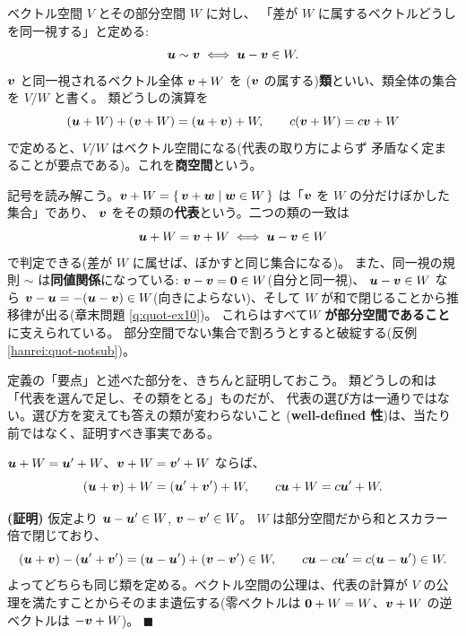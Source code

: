 \begin{teigi}[商空間]
ベクトル空間 $V$ とその部分空間 $W$ に対し、
「差が $W$ に属するベクトルどうしを同一視する」と定める:
\[
\bm{u} \sim \bm{v} \iff \bm{u} - \bm{v} \in W.
\]
$\bm{v}$ と同一視されるベクトル全体 $\bm{v} + W$ を
($\bm{v}$ の属する)\textbf{類}といい、類全体の集合を $V/W$ と書く。
類どうしの演算を
\[
(\bm{u} + W) + (\bm{v} + W) = (\bm{u} + \bm{v}) + W, \qquad
c(\bm{v} + W) = c\bm{v} + W
\]
で定めると、$V/W$ はベクトル空間になる(代表の取り方によらず
矛盾なく定まることが要点である)。これを\textbf{商空間}という。
\end{teigi}

記号を読み解こう。$\bm{v} + W = \{\, \bm{v} + \bm{w} \mid
\bm{w} \in W \,\}$ は「$\bm{v}$ を $W$ の分だけぼかした集合」であり、
$\bm{v}$ をその類の\textbf{代表}という。二つの類の一致は
\[
\bm{u} + W = \bm{v} + W \iff \bm{u} - \bm{v} \in W
\]
で判定できる(差が $W$ に属せば、ぼかすと同じ集合になる)。
また、同一視の規則 $\sim$ は\textbf{同値関係}になっている:
$\bm{v} - \bm{v} = \bm{0} \in W$(自分と同一視)、
$\bm{u} - \bm{v} \in W$ なら $\bm{v} - \bm{u} =
-(\bm{u} - \bm{v}) \in W$(向きによらない)、そして
$W$ が和で閉じることから推移律が出る(章末問題 \ref{q:quot-ex10})。
これらはすべて\textbf{$W$ が部分空間であること}に支えられている。
部分空間でない集合で割ろうとすると破綻する(反例 \ref{hanrei:quot-notsub})。

定義の「要点」と述べた部分を、きちんと証明しておこう。
類どうしの和は「代表を選んで足し、その類をとる」ものだが、
代表の選び方は一通りではない。選び方を変えても答えの類が変わらないこと
(\textbf{well-defined 性})は、当たり前ではなく、証明すべき事実である。

\begin{teiri}[類の演算は代表の取り方によらない]\label{thm:quot-welldef}
$\bm{u} + W = \bm{u}' + W$、$\bm{v} + W = \bm{v}' + W$ ならば、
\[
(\bm{u} + \bm{v}) + W = (\bm{u}' + \bm{v}') + W, \qquad
c\bm{u} + W = c\bm{u}' + W.
\]
\end{teiri}

\noindent\textbf{(証明)}\quad
仮定より $\bm{u} - \bm{u}' \in W$, $\bm{v} - \bm{v}' \in W$。
$W$ は部分空間だから和とスカラー倍で閉じており、
\[
(\bm{u} + \bm{v}) - (\bm{u}' + \bm{v}')
= (\bm{u} - \bm{u}') + (\bm{v} - \bm{v}') \in W, \qquad
c\bm{u} - c\bm{u}' = c(\bm{u} - \bm{u}') \in W.
\]
よってどちらも同じ類を定める。ベクトル空間の公理は、代表の計算が
$V$ の公理を満たすことからそのまま遺伝する(零ベクトルは
$\bm{0} + W = W$、$\bm{v} + W$ の逆ベクトルは $-\bm{v} + W$)。
$\blacksquare$

